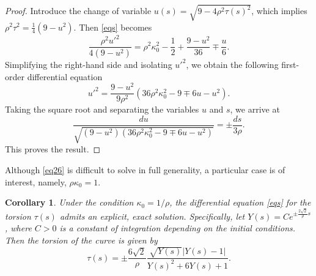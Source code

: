 \documentclass[a4paper,12pt]{amsart}
\theoremstyle{plain}
\newtheorem{corollary}[theorem]{Corollary}
\theoremstyle{definition}
\begin{document}
\begin{proof}
Introduce the change of variable $u(s) = \sqrt{9 - 4\rho^2\tau(s)^2}$, which implies $\rho^2\tau^2 = \frac{1}{4}(9 - u^2)$. Then  \eqref{eqs} becomes 
\begin{equation*}
    \frac{\rho^2 u'^2}{4(9 - u^2)} = \rho^2\kappa_0^2 - \frac{1}{2} + \frac{9 - u^2}{36} \mp \frac{u}{6}.
\end{equation*}
Simplifying the right-hand side and isolating $u'^2$, we obtain the following first-order   differential equation
\begin{equation*}
    u'^2 = \frac{9 - u^2}{9\rho^2} \left( 36\rho^2\kappa_0^2 - 9 \mp 6u - u^2 \right).
\end{equation*}
Taking the square root and separating the variables $u$ and $s$, we arrive at
\begin{equation*}
    \frac{du}{\sqrt{(9 - u^2)\left( 36\rho^2\kappa_0^2 - 9 \mp 6u - u^2 \right)}} = \pm \frac{ds}{3\rho}.
\end{equation*}
This proves the result.
\end{proof}
 Although \eqref{eq26} is difficult to solve in full generality, a particular case is of interest, namely, $\rho\kappa_0=1$. 


\begin{corollary}\label{cor34}
Under the   condition $\kappa_0 = 1/\rho$, the   differential equation \eqref{eqs} for the torsion $\tau(s)$ admits an  explicit,   exact solution. Specifically, let   $Y(s) = C e^{\pm \frac{2\sqrt{2}}{\rho} s}$, where $C > 0$ is a constant of integration depending on the initial conditions. Then the torsion of the curve is given by
\begin{equation*}
    \tau(s) = \pm \frac{6\sqrt{2}}{\rho} \frac{\sqrt{Y(s)}\big|Y(s) - 1\big|}{Y(s)^2 + 6Y(s) + 1}.
\end{equation*}
\end{corollary}
\end{document}
